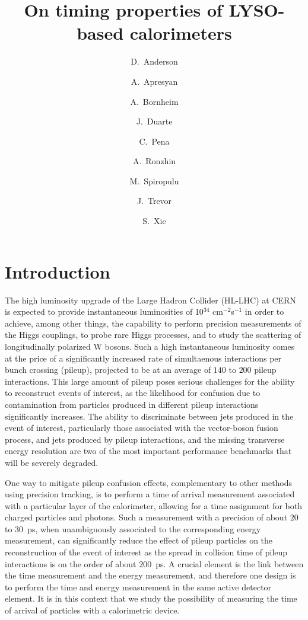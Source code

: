 \documentclass[12pt]{article}
\title{On timing properties of LYSO-based calorimeters}
\author[1]{D.~Anderson}
\author[1]{A.~Apresyan}
\author[1]{A.~Bornheim}
\author[1]{J.~Duarte}
\author[1]{C.~Pena}
\author[2]{A.~Ronzhin}
\author[1]{M.~Spiropulu}
\author[1]{J.~Trevor}
\author[1]{S.~Xie}
\affil[1]{California Institute of Technology, Pasadena, CA, USA}
\affil[2]{Fermi National Accelerator Laboratory, Batavia, IL, USA}
\date{}
\begin{document}
\maketitle
{}



\section{Introduction}

The high luminosity upgrade of the Large Hadron Collider (HL-LHC) at
CERN~\cite{Rossi:1471000} is expected to provide instantaneous luminosities of
10$^{34}$ cm$^{-2}$s$^{-1}$ in order to achieve, among other things, the
capability to perform precision measurements of the Higgs couplings, to probe
rare Higgs processes, and to study the scattering of longitudinally polarized W
bosons. Such a high instantaneous luminosity comes at the price of a
significantly increased rate of simultaenous interactions per bunch crossing
(pileup), projected to be at an average of $140$ to $200$ pileup interactions.
This large amount of pileup poses serious challenges for the ability to
reconstruct events of interest, as the likelihood for confusion due to
contamination from particles produced in different pileup interactions
significantly increases. The ability to discriminate between jets produced in
the event of interest, particularly those associated with the vector-boson
fusion process, and jets produced by pileup interactions, and the missing
transverse energy resolution are two of the most important performance
benchmarks that will be severely degraded.

One way to mitigate pileup confusion effects, complementary to other methods
using precision tracking, is to perform a time of arrival measurement associated
with a particular layer of the calorimeter, allowing for a time assignment for
both charged particles and photons. Such a measurement with a precision of about
$20$ to $30$~ps, when unambiguously associated to the corresponding energy
measurement, can significantly reduce the effect of pileup particles on the
reconstruction of the event of interest as the spread in collision time of
pileup interactions is on the order of about $200$~ps. A crucial element is the
link between the time measurement and the energy measurement, and therefore one
design is to perform the time and energy measurement in the same active detector
element. It is in this context that we study the possibility of measuring the
time of arrival of particles with a calorimetric device.
\end{document}
